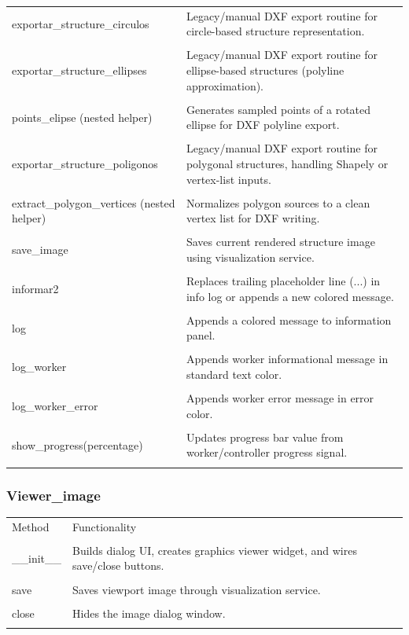 ﻿\documentclass[11pt,a4paper]{article}
\begin{document}
\begin{longtable}{|p{}|p{}|}
\hline
exportar\_structure\_circulos & Legacy/manual DXF export routine for circle-based structure representation. \\\\
\hline
exportar\_structure\_ellipses & Legacy/manual DXF export routine for ellipse-based structures (polyline approximation). \\\\
\hline
points\_elipse (nested helper) & Generates sampled points of a rotated ellipse for DXF polyline export. \\\\
\hline
exportar\_structure\_poligonos & Legacy/manual DXF export routine for polygonal structures, handling Shapely or vertex-list inputs. \\\\
\hline
extract\_polygon\_vertices (nested helper) & Normalizes polygon sources to a clean vertex list for DXF writing. \\\\
\hline
save\_image & Saves current rendered structure image using visualization service. \\\\
\hline
informar2 & Replaces trailing placeholder line (...) in info log or appends a new colored message. \\\\
\hline
log & Appends a colored message to information panel. \\\\
\hline
log\_worker & Appends worker informational message in standard text color. \\\\
\hline
log\_worker\_error & Appends worker error message in error color. \\\\
\hline
show\_progress(percentage) & Updates progress bar value from worker/controller progress signal. \\\\
\hline
\end{longtable}


\subsubsection*{Viewer\_image}

\begin{longtable}{|p{}|p{}|}
\hline
Method & Functionality \\\\
\hline
\_\_init\_\_ & Builds dialog UI, creates graphics viewer widget, and wires save/close buttons. \\\\
\hline
save & Saves viewport image through visualization service. \\\\
\hline
close & Hides the image dialog window. \\\\
\hline
\end{longtable}
\end{document}
